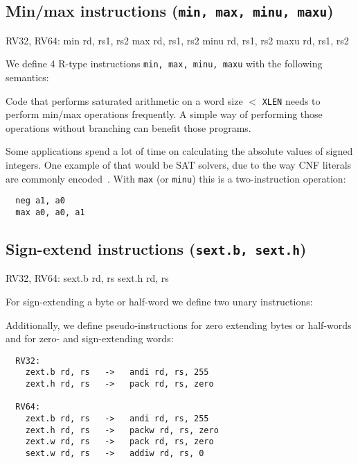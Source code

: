 \subsection{Min/max instructions (\texttt{min, max, minu, maxu})}

\begin{rvb}
  RV32, RV64:
    min  rd, rs1, rs2
    max  rd, rs1, rs2
    minu rd, rs1, rs2
    maxu rd, rs1, rs2
\end{rvb}

We define 4 R-type instructions \texttt{min, max, minu, maxu} with the
following semantics:



Code that performs saturated arithmetic on a word size $<$ \texttt{XLEN} needs to perform
min/max operations frequently. A simple way of performing those operations without branching
can benefit those programs.

Some applications spend a lot of time on calculating the absolute values of
signed integers. One example of that would be SAT solvers, due to the way CNF
literals are commonly encoded~\cite{BiereComm}. With \texttt{max} (or
\texttt{minu}) this is a two-instruction operation:

\begin{minipage}{\linewidth}
\begin{verbatim}
  neg a1, a0
  max a0, a0, a1
\end{verbatim}
\end{minipage}


\subsection{Sign-extend instructions (\texttt{sext.b, sext.h})}

\begin{rvb}
  RV32, RV64:
    sext.b rd, rs
    sext.h rd, rs
\end{rvb}

For sign-extending a byte or half-word we define two unary instructions:



Additionally, we define pseudo-instructions for zero extending bytes or
half-words and for zero- and sign-extending words:

\begin{minipage}{\linewidth}
\begin{verbatim}
  RV32:
    zext.b rd, rs   ->   andi rd, rs, 255
    zext.h rd, rs   ->   pack rd, rs, zero

  RV64:
    zext.b rd, rs   ->   andi rd, rs, 255
    zext.h rd, rs   ->   packw rd, rs, zero
    zext.w rd, rs   ->   pack rd, rs, zero
    sext.w rd, rs   ->   addiw rd, rs, 0
\end{verbatim}
\end{minipage}

